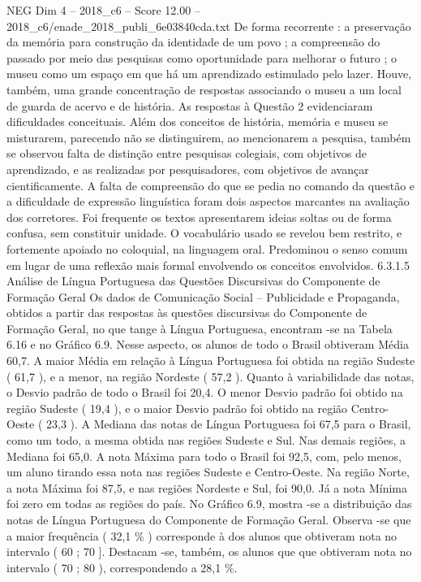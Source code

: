 \begin{textsample}{NEG Dim 4 – 2018\_c6 – Score 12.00 – 2018\_c6/enade\_2018\_publi\_6e03840cda.txt}
De forma recorrente : a preservação da memória para construção da identidade de um povo ; a compreensão do passado por meio das pesquisas como oportunidade para melhorar o futuro ; o museu como um espaço em que há um aprendizado estimulado pelo lazer.
Houve, também, uma grande concentração de respostas associando o museu a um local de guarda de acervo e de história.
As respostas à Questão 2 evidenciaram dificuldades conceituais.
Além dos conceitos de história, memória e museu se misturarem, parecendo não se distinguirem, ao mencionarem a pesquisa, também se observou falta de distinção entre pesquisas colegiais, com objetivos de aprendizado, e as realizadas por pesquisadores, com objetivos de avançar cientificamente.
A falta de compreensão do que se pedia no comando da questão e a dificuldade de expressão linguística foram dois aspectos marcantes na avaliação dos corretores.
Foi frequente os textos apresentarem ideias soltas ou de forma confusa, sem constituir unidade.
O vocabulário usado se revelou bem restrito, e fortemente apoiado no coloquial, na linguagem oral.
Predominou o senso comum em lugar de uma reflexão mais formal envolvendo os conceitos envolvidos. 6.3.1.5 Análise de Língua Portuguesa das Questões Discursivas do Componente de Formação Geral Os dados de Comunicação Social – Publicidade e Propaganda, obtidos a partir das respostas às questões discursivas do Componente de Formação Geral, no que tange à Língua Portuguesa, encontram -se na Tabela 6.16 e no Gráfico 6.9.
Nesse aspecto, os alunos de todo o Brasil obtiveram Média 60,7.
A maior Média em relação à Língua Portuguesa foi obtida na região Sudeste ( 61,7 ), e a menor, na região Nordeste ( 57,2 ).
Quanto à variabilidade das notas, o Desvio padrão de todo o Brasil foi 20,4.
O menor Desvio padrão foi obtido na região Sudeste ( 19,4 ), e o maior Desvio padrão foi obtido na região Centro-Oeste ( 23,3 ).
A Mediana das notas de Língua Portuguesa foi 67,5 para o Brasil, como um todo, a mesma obtida nas regiões Sudeste e Sul.
Nas demais regiões, a Mediana foi 65,0.
A nota Máxima para todo o Brasil foi 92,5, com, pelo menos, um aluno tirando essa nota nas regiões Sudeste e Centro-Oeste.
Na região Norte, a nota Máxima foi 87,5, e nas regiões Nordeste e Sul, foi 90,0.
Já a nota Mínima foi zero em todas as regiões do país.
No Gráfico 6.9, mostra -se a distribuição das notas de Língua Portuguesa do Componente de Formação Geral.
Observa -se que a maior frequência ( 32,1 \% ) corresponde à dos alunos que obtiveram nota no intervalo ( 60 ; 70 ].
Destacam -se, também, os alunos que que obtiveram nota no intervalo ( 70 ; 80 ), correspondendo a 28,1 \%.

\end{textsample}
